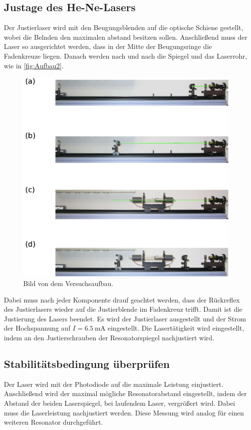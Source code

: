 \subsection{Justage des He-Ne-Lasers}
\label{subsec:Justage}
Der Justierlaser wird mit den Beugungsblenden auf die optische Schiene gestellt, wobei die Belnden den maximalen abstand besitzen sollen.
Anschließend muss der Laser so ausgerichtet werden, dass in der Mitte der Beugungsringe die Fadenkreuze liegen.
Danach werden nach und nach die Spiegel und das Laserrohr, wie in \autoref{fig:Aufbau2}.
\begin{figure}[H]
    \centering
    \includegraphics[scale=0.7]{Abbildungen/Aufbau2.png}
    \caption{Bild von dem Versuchsaufbau.\cite{V61}}
    \label{fig:Aufbau2}
\end{figure}
Dabei muss nach jeder Komponente drauf geachtet werden, dass der Rückreflex des Justierlasers wieder auf die Justierblende im Fadenkreuz trifft.
Damit ist die Justierung des Lasers beendet. Es wird der Justierlaser ausgestellt und der Strom der Hochspannung
auf $I = \qty{6.5}{\milli\A}$ eingestellt. Die Lasertätigkeit wird eingestellt, indem an den Justierschrauben der Resonatorspiegel nachjustiert wird.

\subsection{Stabilitätsbedingung überprüfen}
\label{subsec:Stabilitätsbedingung}
Der Laser wird mit der Photodiode auf die maximale Leistung einjustiert.
Anschließend wird der maximal mögliche Resonatorabstand eingestellt, indem der Abstand der beiden Laserspiegel, bei laufendem Laser, vergrößert wird.
Dabei muss die Laserleistung nachjustiert werden.
Diese Messung wird analog für einen weiteren Resonator durchgeführt.

